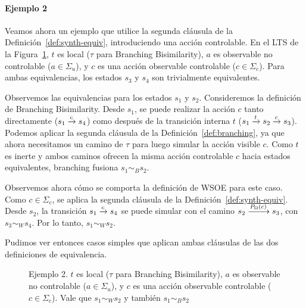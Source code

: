 \paragraph{Ejemplo 2}
Veamos ahora un ejemplo que utilice la segunda cláusula de la Definición~\ref{def:synth-equiv}, introduciendo una acción controlable. En el LTS de la Figura~\ref{fig:cap3-ej2}, $t$ es local ($\tau$ para Branching Bisimilarity), $a$ es observable no controlable ($a \in \Sigma_u$), y $c$ es una acción observable controlable ($c \in \Sigma_c$). Para ambas equivalencias, los estados $s_3$ y $s_4$ son trivialmente equivalentes.

Observemos las equivalencias para los estados $s_1$ y $s_2$.
Consideremos la definición de Branching Bisimilarity. Desde $s_1$, se puede realizar la acción $c$ tanto directamente ($s_1 \pijl{c} s_4$) como después de la transición interna $t$ ($s_1 \pijl{t} s_2 \pijl{c} s_3$). Podemos aplicar la segunda cláusula de la Definición~\ref{def:branching}, ya que ahora necesitamos un camino de $\tau$ para luego simular la acción visible $c$. Como $t$ es inerte y ambos caminos ofrecen la misma acción controlable $c$ hacia estados equivalentes, branching fusiona $s_1 \sim_{B} s_2$.

Observemos ahora cómo se comporta la definición de WSOE para este caso. Como $c \in \Sigma_c$, se aplica la segunda cláusula de la Definición~\ref{def:synth-equiv}. Desde $s_2$, la transición $s_1 \pijl{c} s_4$ se puede simular con el camino $s_2 \pijl{P_{\Omega}(c)} s_3$, con $s_3 \sim_{W} s_4$. Por lo tanto,  $s_1 \sim_{W} s_2$.

Pudimos ver entonces casos simples que aplican ambas cláusulas de las dos definiciones de equivalencia.

\begin{figure}[htbp]
  \centering
  \caption{Ejemplo 2. $t$ es local ($\tau$ para Branching Bisimilarity), $a$ es observable no controlable ($a \in \Sigma_u$), y $c$ es una acción observable controlable ($c \in \Sigma_c$). Vale que $s_1 \sim_{W} s_2$ y también  $s_1 \sim_{B} s_2$}
  \label{fig:cap3-ej2}
\end{figure}

